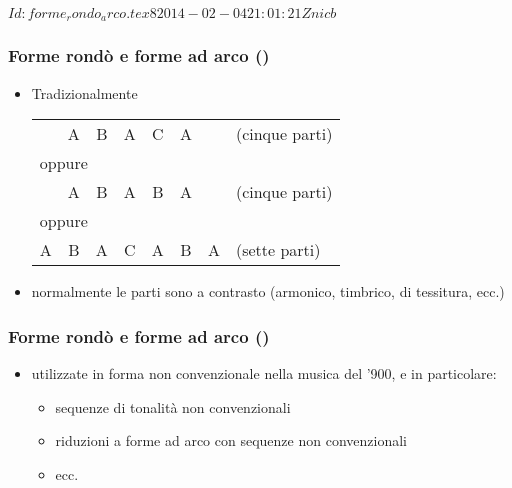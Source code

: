 %
%
\svnInfo $Id: forme_rondo_arco.tex 8 2014-02-04 21:01:21Z nicb $

\setcounter{ms}{0}
\begin{frame}
    \frametitle{Forme rond\`o e forme ad arco ()}

    \begin{itemize}

        \item Tradizionalmente

                \begin{tabular}{*{6}{c} p{} p{}}
                     & A & B & A & C & A &  & (cinque parti)\\
                     \multicolumn{8}{l}{oppure}\\
                     & A & B & A & B & A &  & (cinque parti)\\
                     \multicolumn{8}{l}{oppure}\\
                     A & B & A & C & A & B & A & (sette parti)\\
                \end{tabular}

        \item normalmente le parti sono a contrasto
            (armonico, timbrico, di tessitura, ecc.)

    \end{itemize}

\end{frame}

\begin{frame}
    \frametitle{Forme rond\`o e forme ad arco ()}

    \begin{itemize}

        \item utilizzate in forma non convenzionale nella musica del '900,
            e in particolare:

        \begin{itemize}

            \item sequenze di tonalit\`a non convenzionali

            \item riduzioni a forme ad arco con sequenze non convenzionali

            \item ecc.

        \end{itemize}

    \end{itemize}

\end{frame}
